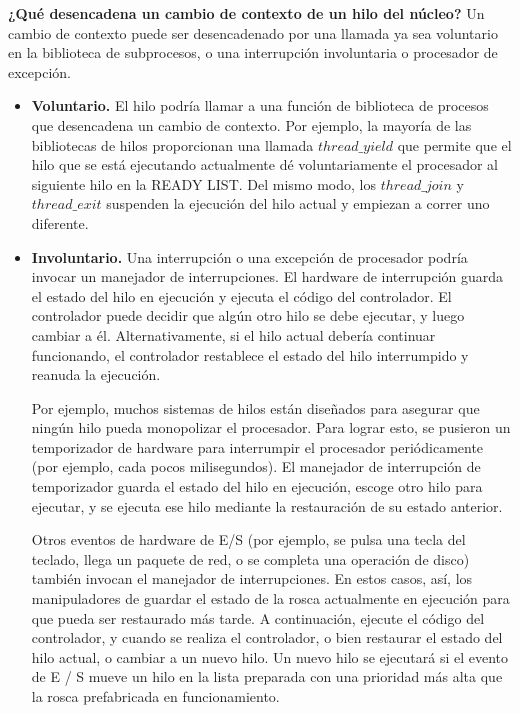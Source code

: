 \documentclass[10pt]{book}
\begin{document}
\textbf{¿Qué desencadena un cambio de contexto de un hilo del núcleo?} Un cambio de contexto puede ser desencadenado por una llamada ya sea voluntario en la biblioteca de subprocesos, o una interrupción involuntaria o procesador de excepción.
\begin{itemize}
\item \textbf{Voluntario.} El hilo podría llamar a una función de biblioteca de procesos que desencadena un cambio de contexto. Por ejemplo, la mayoría de las bibliotecas de hilos proporcionan una llamada $thread\_ yield$ que permite que el hilo que se está ejecutando actualmente dé voluntariamente el procesador al siguiente hilo en la READY LIST. Del mismo modo, los $thread\_ join$ y $thread\_ exit$ suspenden la ejecución del hilo actual y empiezan a correr uno diferente.

\item \textbf{Involuntario.} Una interrupción o una excepción de procesador podría invocar un manejador de interrupciones. El hardware de interrupción guarda el estado del hilo en ejecución y ejecuta el código del controlador. El controlador puede decidir que algún otro hilo se debe ejecutar, y luego cambiar a él. Alternativamente, si el hilo actual debería continuar funcionando, el controlador restablece el estado del hilo interrumpido y reanuda la ejecución.

Por ejemplo, muchos sistemas de hilos están diseñados para asegurar que ningún hilo pueda monopolizar el procesador. Para lograr esto, se pusieron un temporizador de hardware para interrumpir el procesador periódicamente (por ejemplo, cada pocos milisegundos). El manejador de interrupción de temporizador guarda el estado del hilo en ejecución, escoge otro hilo para ejecutar, y se ejecuta ese hilo mediante la restauración de su estado anterior.

Otros eventos de hardware de E/S (por ejemplo, se pulsa una tecla del teclado, llega un paquete de red, o se completa una operación de disco) también invocan el manejador de interrupciones. En estos casos, así, los manipuladores de guardar el estado de la rosca actualmente en ejecución para que pueda ser restaurado más tarde. A continuación, ejecute el código del controlador, y cuando se realiza el controlador, o bien restaurar el estado del hilo actual, o cambiar a un nuevo hilo. Un nuevo hilo se ejecutará si el evento de E / S mueve un hilo en la lista preparada con una prioridad más alta que la rosca prefabricada en funcionamiento.
\end{itemize}
\end{document}
